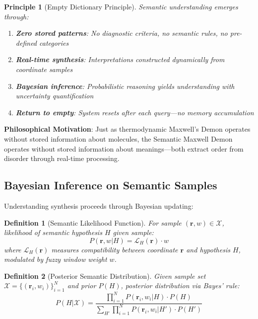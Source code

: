 \documentclass[12pt,a4paper]{article}
\newtheorem{definition}{Definition}
\newtheorem{principle}{Principle}
\begin{document}
\begin{principle}[Empty Dictionary Principle]
Semantic understanding emerges through:
\begin{enumerate}
\item \textbf{Zero stored patterns}: No diagnostic criteria, no semantic rules, no pre-defined categories
\item \textbf{Real-time synthesis}: Interpretations constructed dynamically from coordinate samples
\item \textbf{Bayesian inference}: Probabilistic reasoning yields understanding with uncertainty quantification
\item \textbf{Return to empty}: System resets after each query—no memory accumulation
\end{enumerate}
\end{principle}

\textbf{Philosophical Motivation}: Just as thermodynamic Maxwell's Demon operates without stored information about molecules, the Semantic Maxwell Demon operates without stored information about meanings—both extract order from disorder through real-time processing.

\subsection{Bayesian Inference on Semantic Samples}

Understanding synthesis proceeds through Bayesian updating:

\begin{definition}[Semantic Likelihood Function]
For sample $(\mathbf{r}, w) \in \mathcal{X}$, likelihood of semantic hypothesis $H$ given sample:
\begin{equation}
P(\mathbf{r}, w | H) = \mathcal{L}_H(\mathbf{r}) \cdot w
\end{equation}
where $\mathcal{L}_H(\mathbf{r})$ measures compatibility between coordinate $\mathbf{r}$ and hypothesis $H$, modulated by fuzzy window weight $w$.
\end{definition}

\begin{definition}[Posterior Semantic Distribution]
Given sample set $\mathcal{X} = \{(\mathbf{r}_i, w_i)\}_{i=1}^N$ and prior $P(H)$, posterior distribution via Bayes' rule:
\begin{equation}
P(H | \mathcal{X}) = \frac{\prod_{i=1}^N P(\mathbf{r}_i, w_i | H) \cdot P(H)}{\sum_{H'} \prod_{i=1}^N P(\mathbf{r}_i, w_i | H') \cdot P(H')}
\end{equation}
\end{definition}
\end{document}
